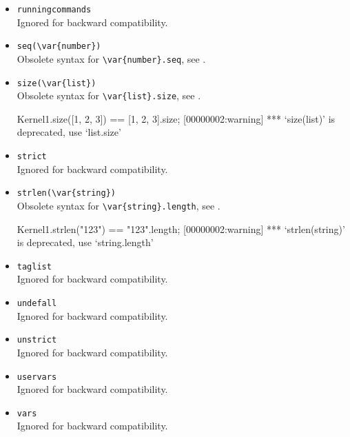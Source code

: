\begin{itemize}
\item \lstinline|runningcommands|\\
  Ignored for backward compatibility.

\item \lstinline|seq(\var{number})|\\
  Obsolete syntax for \lstinline|\var{number}.seq|, see
  .

\item \lstinline|size(\var{list})|\\
  Obsolete syntax for \lstinline|\var{list}.size|, see
  .
\begin{urbiassert}[firstnumber=last]
Kernel1.size([1, 2, 3]) == [1, 2, 3].size;
[00000002:warning] *** `size(list)' is deprecated, use `list.size'
\end{urbiassert}

\item \lstinline|strict|\\
  Ignored for backward compatibility.

\item \lstinline|strlen(\var{string})|\\
  Obsolete syntax for \lstinline|\var{string}.length|, see
  .
\begin{urbiassert}[firstnumber=last]
Kernel1.strlen("123") == "123".length;
[00000002:warning] *** `strlen(string)' is deprecated, use `string.length'
\end{urbiassert}

\item \lstinline|taglist|\\
  Ignored for backward compatibility.

\item \lstinline|undefall|\\
  Ignored for backward compatibility.

\item \lstinline|unstrict|\\
  Ignored for backward compatibility.

\item \lstinline|uservars|\\
  Ignored for backward compatibility.

\item \lstinline|vars|\\
  Ignored for backward compatibility.
\end{itemize}


